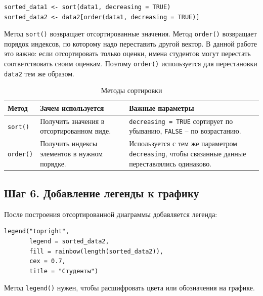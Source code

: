 \documentclass[14pt,a4paper]{extarticle}
\begin{document}
\begin{lstlisting}
sorted_data1 <- sort(data1, decreasing = TRUE)
sorted_data2 <- data2[order(data1, decreasing = TRUE)]
\end{lstlisting}

Метод \texttt{sort()} возвращает отсортированные значения. Метод \texttt{order()} возвращает порядок индексов, по которому надо переставить другой вектор. В данной работе это важно: если отсортировать только оценки, имена студентов могут перестать соответствовать своим оценкам. Поэтому \texttt{order()} используется для перестановки \texttt{data2} тем же образом.

\begin{table}[H]
\caption{Методы сортировки}
\begin{tabularx}{\textwidth}{|l|Y|Y|}
\hline
\textbf{Метод} & \textbf{Зачем используется} & \textbf{Важные параметры} \\
\hline
\texttt{sort()} & Получить значения в отсортированном виде. & \texttt{decreasing = TRUE} сортирует по убыванию, \texttt{FALSE} -- по возрастанию. \\
\hline
\texttt{order()} & Получить индексы элементов в нужном порядке. & Используется с тем же параметром \texttt{decreasing}, чтобы связанные данные переставлялись одинаково. \\
\hline
\end{tabularx}
\end{table}

\subsection{Шаг 6. Добавление легенды к графику}

После построения отсортированной диаграммы добавляется легенда:

\begin{lstlisting}
legend("topright",
       legend = sorted_data2,
       fill = rainbow(length(sorted_data2)),
       cex = 0.7,
       title = "Студенты")
\end{lstlisting}

Метод \texttt{legend()} нужен, чтобы расшифровать цвета или обозначения на графике.
\end{document}
